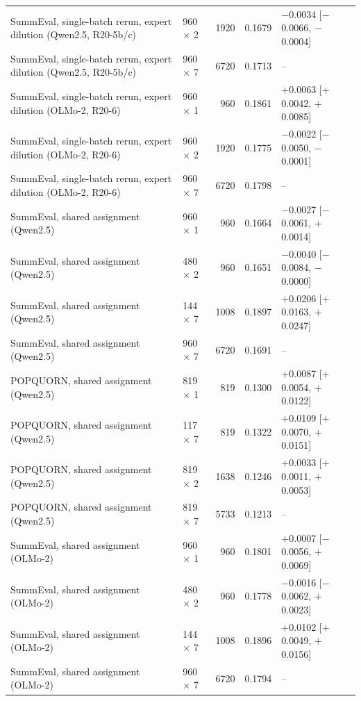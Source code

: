 \begin{table}[t]
\begin{tabular}{llrrl}
SummEval, single-batch rerun, expert dilution (Qwen2.5, R20-5b/c) & 960 $\times$ 2 & 1920 & 0.1679 & $-$0.0034 [$-$0.0066, $-$0.0004] \\
SummEval, single-batch rerun, expert dilution (Qwen2.5, R20-5b/c) & 960 $\times$ 7 & 6720 & 0.1713 & -- \\
\midrule
SummEval, single-batch rerun, expert dilution (OLMo-2, R20-6) & 960 $\times$ 1 & 960 & 0.1861 & $+$0.0063 [$+$0.0042, $+$0.0085] \\
SummEval, single-batch rerun, expert dilution (OLMo-2, R20-6) & 960 $\times$ 2 & 1920 & 0.1775 & $-$0.0022 [$-$0.0050, $-$0.0001] \\
SummEval, single-batch rerun, expert dilution (OLMo-2, R20-6) & 960 $\times$ 7 & 6720 & 0.1798 & -- \\
\midrule
SummEval, shared assignment (Qwen2.5) & 960 $\times$ 1 & 960 & 0.1664 & $-$0.0027 [$-$0.0061, $+$0.0014] \\
SummEval, shared assignment (Qwen2.5) & 480 $\times$ 2 & 960 & 0.1651 & $-$0.0040 [$-$0.0084, $-$0.0000] \\
SummEval, shared assignment (Qwen2.5) & 144 $\times$ 7 & 1008 & 0.1897 & $+$0.0206 [$+$0.0163, $+$0.0247] \\
SummEval, shared assignment (Qwen2.5) & 960 $\times$ 7 & 6720 & 0.1691 & -- \\
\midrule
POPQUORN, shared assignment (Qwen2.5) & 819 $\times$ 1 & 819 & 0.1300 & $+$0.0087 [$+$0.0054, $+$0.0122] \\
POPQUORN, shared assignment (Qwen2.5) & 117 $\times$ 7 & 819 & 0.1322 & $+$0.0109 [$+$0.0070, $+$0.0151] \\
POPQUORN, shared assignment (Qwen2.5) & 819 $\times$ 2 & 1638 & 0.1246 & $+$0.0033 [$+$0.0011, $+$0.0053] \\
POPQUORN, shared assignment (Qwen2.5) & 819 $\times$ 7 & 5733 & 0.1213 & -- \\
\midrule
SummEval, shared assignment (OLMo-2) & 960 $\times$ 1 & 960 & 0.1801 & $+$0.0007 [$-$0.0056, $+$0.0069] \\
SummEval, shared assignment (OLMo-2) & 480 $\times$ 2 & 960 & 0.1778 & $-$0.0016 [$-$0.0062, $+$0.0023] \\
SummEval, shared assignment (OLMo-2) & 144 $\times$ 7 & 1008 & 0.1896 & $+$0.0102 [$+$0.0049, $+$0.0156] \\
SummEval, shared assignment (OLMo-2) & 960 $\times$ 7 & 6720 & 0.1794 & -- \\
\bottomrule\end{tabular}\end{table}